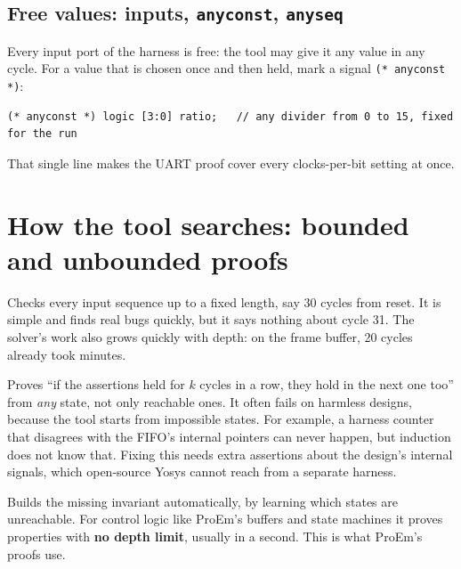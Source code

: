 \documentclass[11pt,a4paper]{article}
\begin{document}
\subsection{Free values: inputs, \texttt{anyconst}, \texttt{anyseq}}
Every input port of the harness is free: the tool may give it any value in any cycle. For a value that is chosen once and then held, mark a signal \texttt{(* anyconst *)}:
\begin{lstlisting}
(* anyconst *) logic [3:0] ratio;   // any divider from 0 to 15, fixed for the run
\end{lstlisting}
That single line makes the UART proof cover every clocks-per-bit setting at once.

\section{How the tool searches: bounded and unbounded proofs}\label{sec:modes}

\begin{description}[style=nextline,leftmargin=1.5em]
\item[Bounded model checking (\texttt{mode bmc})]
Checks every input sequence up to a fixed length, say 30 cycles from reset. It is simple and finds real bugs quickly, but it says nothing about cycle 31. The solver's work also grows quickly with depth: on the frame buffer, 20 cycles already took minutes.

\item[k-induction (\texttt{mode prove} with \texttt{smtbmc})]
Proves ``if the assertions held for $k$ cycles in a row, they hold in the next one too'' from \emph{any} state, not only reachable ones. It often fails on harmless designs, because the tool starts from impossible states. For example, a harness counter that disagrees with the FIFO's internal pointers can never happen, but induction does not know that. Fixing this needs extra assertions about the design's internal signals, which open-source Yosys cannot reach from a separate harness.

\item[PDR, also called IC3 (\texttt{mode prove} with \texttt{abc pdr})]
Builds the missing invariant automatically, by learning which states are unreachable. For control logic like ProEm's buffers and state machines it proves properties with \textbf{no depth limit}, usually in a second. This is what ProEm's proofs use.
\end{description}
\end{document}
